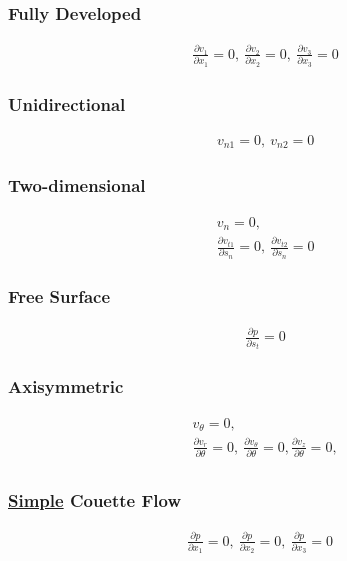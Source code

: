 \documentclass[11pt, letterpaper, notitlepage]{article}
\begin{document}
\subsubsection{Fully Developed}
\begin{align*}
& \frac{\partial v_1}{\partial x_1} = 0,\ \frac{\partial v_2}{\partial x_2} = 0,\ \frac{\partial v_3}{\partial x_3} = 0
\end{align*}

\subsubsection{Unidirectional}
\begin{align*}
& v_{n1} = 0,\ v_{n2} = 0
\end{align*}

\subsubsection{Two-dimensional}
\begin{align*}
& v_{n} = 0,\\
&\frac{\partial v_{t1}}{\partial s_n} = 0,\ \frac{\partial v_{t2}}{\partial s_n} = 0
\end{align*}

\subsubsection{Free Surface}
\begin{align*}
& \frac{\partial p}{\partial s_t} =0
\end{align*}

\subsubsection{Axisymmetric}
\begin{align*}
& v_\theta = 0, \\
& \frac{\partial v_r}{\partial \theta} = 0,\ \frac{\partial v_\theta}{\partial \theta} = 0, \frac{\partial v_z}{\partial \theta} = 0,\\
\end{align*}

\subsubsection{\underline{Simple} Couette Flow}
\begin{align*}
\frac{\partial p}{\partial x_1} = 0,\ \frac{\partial p}{\partial x_2} = 0,\ \frac{\partial p}{\partial x_3} = 0 
\end{align*}
\end{document}
